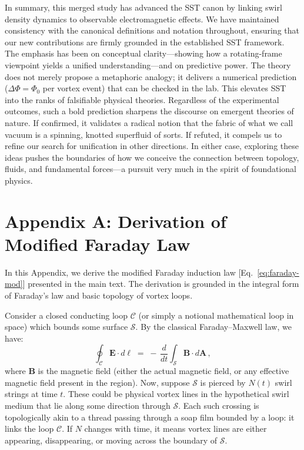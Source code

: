 \documentclass[12pt]{article}
\begin{document}
    In summary, this merged study has advanced the SST canon by linking swirl density dynamics to observable electromagnetic effects. We have maintained consistency with the canonical definitions and notation \cite{Iskandarani2025Canon,Iskandarani2025Rosetta} throughout, ensuring that our new contributions are firmly grounded in the established SST framework. The emphasis has been on conceptual clarity—showing how a rotating-frame viewpoint yields a unified understanding—and on predictive power. The theory does not merely propose a metaphoric analogy; it delivers a numerical prediction ($\Delta \Phi = \Phi_{0}$ per vortex event) that can be checked in the lab. This elevates SST into the ranks of falsifiable physical theories. Regardless of the experimental outcomes, such a bold prediction sharpens the discourse on emergent theories of nature. If confirmed, it validates a radical notion that the fabric of what we call vacuum is a spinning, knotted superfluid of sorts. If refuted, it compels us to refine our search for unification in other directions. In either case, exploring these ideas pushes the boundaries of how we conceive the connection between topology, fluids, and fundamental forces—a pursuit very much in the spirit of foundational physics.

    \appendix
\section*{Appendix A: Derivation of Modified Faraday Law}\label{app:Faraday}
    In this Appendix, we derive the modified Faraday induction law [Eq.~\eqref{eq:faraday-mod}] presented in the main text. The derivation is grounded in the integral form of Faraday's law and basic topology of vortex loops.

    Consider a closed conducting loop $\mathcal{C}$ (or simply a notional mathematical loop in space) which bounds some surface $\mathcal{S}$. By the classical Faraday–Maxwell law, we have:
    \begin{equation}\label{eq:faraday-integral}
    \oint_{\mathcal{C}} \mathbf{E}\cdot d\boldsymbol{\ell} \;=\; -\,\frac{d}{dt}\int_{\mathcal{S}} \mathbf{B}\cdot d\mathbf{A}\,,
    \end{equation}
    where $\mathbf{B}$ is the magnetic field (either the actual magnetic field, or any effective magnetic field present in the region). Now, suppose $\mathcal{S}$ is pierced by $N(t)$ swirl strings at time $t$. These could be physical vortex lines in the hypothetical swirl medium that lie along some direction through $\mathcal{S}$. Each such crossing is topologically akin to a thread passing through a soap film bounded by a loop: it links the loop $\mathcal{C}$. If $N$ changes with time, it means vortex lines are either appearing, disappearing, or moving across the boundary of $\mathcal{S}$.
\end{document}
